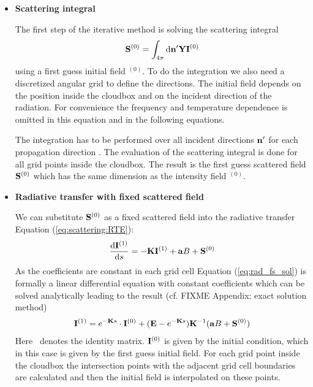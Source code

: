 \begin{itemize}
\item {\bf Scattering integral}

The first step  of the iterative method is solving the scattering integral
\begin{eqnarray}
  {\bf S}^{(0)} = \int_{4\pi} \mathrm{d} {\bf n}^\prime
  {\bf Y} {\bf I}^{(0)}
\end{eqnarray}
using a first guess initial field \StoVec$^{(0)}$. To do the
integration we also need a discretized angular grid to define the
directions. The initial field depends on the
position inside the cloudbox and on the incident direction of the
radiation. For
convenience the frequency and temperature dependence is omitted in
this equation and in the following equations. 

The integration has to be performed over all incident directions
${\bf n}^\prime$ for each 
propagation direction \PDir{}. The evaluation of the scattering
integral is done for all grid points inside the cloudbox. The result
is the first guess scattered field ${\bf S}^{(0)}$
which has the same dimension as the intensity field \StoVec$^{(0)}$. 




\item{\bf Radiative transfer with fixed scattered field}

We can substitute  ${\bf S}^{(0)}$ as a fixed scattered field into the
radiative transfer 
Equation (\ref{eq:scattering:RTE}):   
\begin{eqnarray}
     \frac{\mathrm{d} {\bf I}^{(1)}}{\mathrm{d} s} =
     -{\bf K} {\bf I}^{(1)} + {\bf a} B
     +{\bf S}^{(0)}
\label{eq:rad_fs_sol}
\end{eqnarray} 
As the coefficients are constant in each
grid cell Equation (\ref{eq:rad_fs_sol}) is formally a linear differential
equation with constant coefficients which can be solved analytically
leading to the result (cf. FIXME Appendix: exact solution method) 
\begin{eqnarray}
  \label{eq:scattering:RTE_sol}
  {\bf I}^{(1)} = e^{-{\bf K} s}\cdot{\bf I}^{(0)} + ({\bf E} - e^{-{\bf K}
    s}) {\bf K}^{-1} ({\bf a} B + {\bf S}^{(0)})
\end{eqnarray}
Here \IdnMat\ denotes the identity matrix. 
${\bf I}^{(0)}$ is given by the initial condition, which in this
case is given by the first guess initial field. For each grid
point inside the cloudbox the intersection points with the adjacent
grid cell boundaries are calculated and then the initial field is
interpolated on these points.


\end{itemize}
